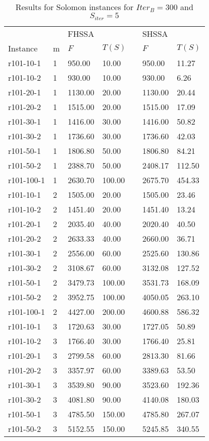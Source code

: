 \documentclass[final,5p,times,twocolumn]{elsarticle}
\begin{document}
{{{{{{{{{{\renewcommand{\arraystretch}{1.2}
\begin{table}[htbp]
\centering
\caption{Results for Solomon instances for $Iter_{B}=300$ and $S_{iter}=5$}
\centering
\begin{tabular}{l l l l l l l}
\hline 
&&\multicolumn{2}{l}{FHSSA}&& \multicolumn{2}{l}{SHSSA}\\
\cline{3-4}\cline{6-7}
Instance & m & $F$ & $T(S)$ && $F$ & $T(S)$\\
\hline
r101-10-1&1&950.00&10.00&&950.00&11.27\\
r101-10-2&1&930.00&10.00&&930.00&6.26\\
r101-20-1&1&1130.00&20.00&&1130.00&20.44\\
r101-20-2&1&1515.00&20.00&&1515.00&17.09\\
r101-30-1&1&1416.00&30.00&&1416.00&50.82\\
r101-30-2&1&1736.60&30.00&&1736.60&42.03\\
r101-50-1&1&1806.80&50.00&&1806.80&84.21\\
r101-50-2&1&2388.70&50.00&&2408.17&112.50\\
r101-100-1&1&2630.70&100.00&&2675.70&454.33\\
r101-10-1&2&1505.00&20.00&&1505.00&23.46\\
r101-10-2&2&1451.40&20.00&&1451.40&13.24\\
r101-20-1&2&2035.40&40.00&&2020.40&40.50\\
r101-20-2&2&2633.33&40.00&&2660.00&36.71\\
r101-30-1&2&2556.00&60.00&&2525.60&130.86\\
r101-30-2&2&3108.67&60.00&&3132.08&127.52\\
r101-50-1&2&3479.73&100.00&&3531.73&168.09\\
r101-50-2&2&3952.75&100.00&&4050.05&263.10\\
r101-100-1&2&4427.00&200.00&&4600.88&586.32\\
r101-10-1&3&1720.63&30.00&&1727.05&50.89\\
r101-10-2&3&1766.40&30.00&&1766.40&25.81\\
r101-20-1&3&2799.58&60.00&&2813.30&81.66\\
r101-20-2&3&3357.97&60.00&&3389.63&53.50\\
r101-30-1&3&3539.80&90.00&&3523.60&192.36\\
r101-30-2&3&4081.80&90.00&&4140.08&180.03\\
r101-50-1&3&4785.50&150.00&&4785.80&267.07\\
r101-50-2&3&5152.55&150.00&&5245.85&340.55\\

\end{tabular}
\end{table}}}}}}}}}}}
\end{document}
